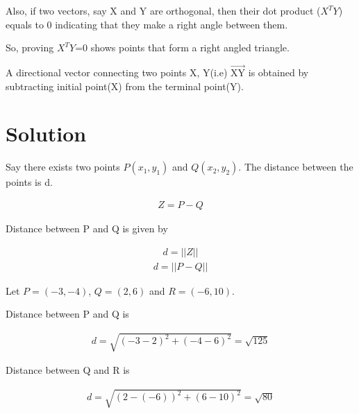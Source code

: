 \documentclass[journal,12pt,twocolumn]{IEEEtran}
\begin{document}
Also, if two vectors, say X  and Y are orthogonal, then their dot product ($X^TY$) equals to 0 indicating that they make a right angle between them. 

So, proving $X^TY$=0 shows points that form a right angled triangle. 

A directional vector connecting two points X, Y(i.e)  $\overrightarrow{\text {XY}}$ is obtained by subtracting initial point(X) from the terminal point(Y). 



\section{Solution}

Say there exists two points $P(x_1, y_1)$ and $Q(x_2, y_2)$. The distance between the points is d. 

\begin{align}
    Z = P - Q
\end{align}

Distance between P and Q is given by 


\begin{align}
d = ||Z||
\end{align}
\begin{align}
d = ||P-Q||
\end{align}



Let $P = (-3, -4)$, $Q = (2, 6)$ and $R = (-6, 10)$.

Distance between P and Q is 

\begin{align}
d = \sqrt{(-3-2)^2+(-4-6)^2}
=\sqrt{125}
\end{align}

Distance between Q and R is 

\begin{align}
d = \sqrt{(2-(-6))^2+(6-10)^2}
=\sqrt{80}
\end{align}
\end{document}
